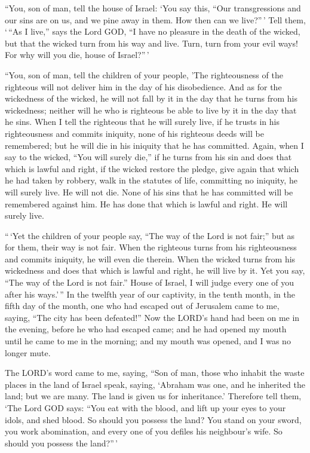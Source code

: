 ``You, son of man, tell the house of Israel: `You say
this, ``Our transgressions and our sins are on us, and we pine away in
them. How then can we live?''\,'  Tell them, `\,``As I
live,'' says the Lord GOD, ``I have no pleasure in the death of the
wicked, but that the wicked turn from his way and live. Turn, turn from
your evil ways! For why will you die, house of Israel?''\,'

 ``You, son of man, tell the children of your people, 'The
righteousness of the righteous will not deliver him in the day of his
disobedience. And as for the wickedness of the wicked, he will not fall
by it in the day that he turns from his wickedness; neither will he who
is righteous be able to live by it in the day that he sins.
 When I tell the righteous that he will surely live, if he
trusts in his righteousness and commits iniquity, none of his righteous
deeds will be remembered; but he will die in his iniquity that he has
committed.  Again, when I say to the wicked, ``You will
surely die,'' if he turns from his sin and does that which is lawful and
right,  if the wicked restore the pledge, give again that
which he had taken by robbery, walk in the statutes of life, committing
no iniquity, he will surely live. He will not die.  None of
his sins that he has committed will be remembered against him. He has
done that which is lawful and right. He will surely live.

 ``\,`Yet the children of your people say, ``The way of the
Lord is not fair;'' but as for them, their way is not fair.
 When the righteous turns from his righteousness and
commits iniquity, he will even die therein.  When the
wicked turns from his wickedness and does that which is lawful and
right, he will live by it.  Yet you say, ``The way of the
Lord is not fair.'' House of Israel, I will judge every one of you after
his ways.'\,''  In the twelfth year of our captivity, in
the tenth month, in the fifth day of the month, one who had escaped out
of Jerusalem came to me, saying, ``The city has been defeated!''
 Now the LORD's hand had been on me in the evening, before
he who had escaped came; and he had opened my mouth until he came to me
in the morning; and my mouth was opened, and I was no longer mute.

 The LORD's word came to me, saying,  ``Son of
man, those who inhabit the waste places in the land of Israel speak,
saying, `Abraham was one, and he inherited the land; but we are many.
The land is given us for inheritance.'  Therefore tell
them, `The Lord GOD says: ``You eat with the blood, and lift up your
eyes to your idols, and shed blood. So should you possess the land?
 You stand on your sword, you work abomination, and every
one of you defiles his neighbour's wife. So should you possess the
land?''\,'

